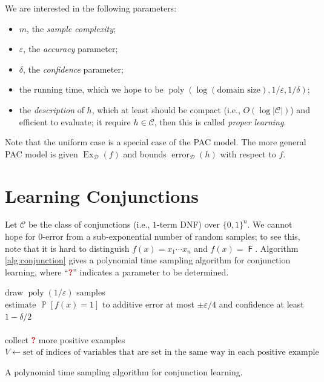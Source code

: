 \documentclass[letterpaper, reqno,11pt]{article}
\newcommand{\PP}{\mathop{{}\mathbb{P}}}
\DeclareMathOperator{\F}{\mathsf{F}}
\DeclareMathOperator{\poly}{poly}
\DeclareMathOperator{\Ex}{Ex}
\DeclareMathOperator{\error}{error}
\begin{document}
We are interested in the following parameters:
\begin{itemize}[itemsep=0pt]
  \item $m$, the \emph{sample complexity};
  \item $\varepsilon$, the \emph{accuracy} parameter;
  \item $\delta$, the \emph{confidence} parameter;
  \item the running time, which we hope to be $\poly(\log(\text{domain size}), 1/\varepsilon, 1/\delta)$;
  \item the \emph{description} of $h$, which at least should be compact (i.e., $O(\log |\mathcal C|)$) and efficient to evaluate; it require $h \in \mathcal C$, then this is called \emph{proper learning}.
\end{itemize}
Note that the uniform case is a special case of the PAC model. The more general PAC model is given $\Ex_{\mathcal D}(f)$ and bounds $\error_{\mathcal D}(h)$ with respect to $f$.

\section{Learning Conjunctions}

Let $\mathcal C$ be the class of conjunctions (i.e., $1$-term DNF) over $\{ 0, 1 \}^n$. We cannot hope for $0$-error from a sub-exponential number of random samples; to see this, note that it is hard to distinguish $f(x) = x_1 \cdots x_n$ and $f(x) = \F$. Algorithm \ref{alg:conjunction} gives a polynomial time sampling algorithm for conjunction learning, where ``\textcolor{red}{\bf ?}'' indicates a parameter to be determined.

\begin{algorithm}
  draw $\poly(1/\varepsilon)$ samples \\
  estimate $\PP[f(x) = 1]$ to additive error at most $\pm \varepsilon/4$ and confidence at least $1 - \delta/2$ \\
   \\
  collect \textcolor{red}{\bf ?} more positive examples \\
  $V \leftarrow \text{set of indices of variables that are set in the same way in each positive example}$ \\
  \caption{A polynomial time sampling algorithm for conjunction learning.}
  \label{alg:conjunction}
\end{algorithm}
\end{document}
